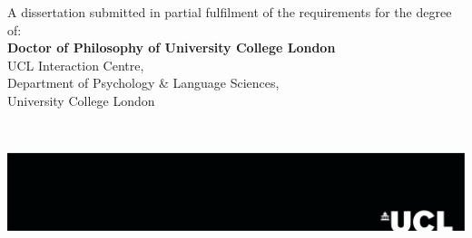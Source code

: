\begin{titlepage}






\vspace{2cm}
\begin{minipage}{\textwidth}
A dissertation submitted in partial fulfilment of the requirements for the degree of: \\

\textbf{Doctor of Philosophy of University College London} \\

UCL Interaction Centre,\\
Department of Psychology \& Language Sciences, \\
University College London
\end{minipage}
~

\vfill %


\begin{flushright} \large
\includegraphics[width=\textwidth]{images/logo.pdf}%
\end{flushright}


\end{titlepage}
